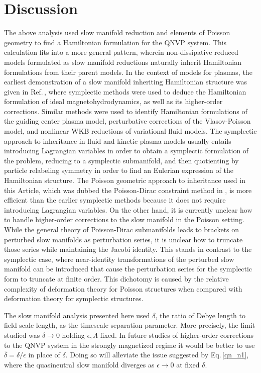 \documentclass[%
 aip,
 amsmath,amssymb,
reprint, onecolumn %
]{revtex4-1}
\begin{document}
\section{Discussion}
The above analysis used slow manifold reduction and elements of Poisson geometry to find a Hamiltonian formulation for the QNVP system. This calculation fits into a more general pattern\cite{r_s_mackay_slow_2004,j_w_burby_slow_2020,burby_slow_2022}, wherein non-dissipative reduced models formulated as slow manifold reductions naturally inherit Hamiltonian formulations from their parent models. In the context of models for plasmas, the earliest demonstration of a slow manifold inheriting Hamiltonian structure was given in Ref.\,, where symplectic methods were used to deduce the Hamiltonian formulation of ideal magnetohydrodynamics, as well as its higher-order corrections. Similar methods were used to identify Hamiltonian formulations of the guiding center plasma model\cite{burby_hamiltonian_2018}, perturbative corrections of the Vlasov-Poisson model\cite{miloshevich_hamiltonian_2021}, and nonlinear WKB reductions of variational fluid models\cite{burby_variational_2020}. The symplectic approach to inheritance in fluid and kinetic plasma models usually entails introducing Lagrangian variables in order to obtain a symplectic formulation of the problem, reducing to a symplectic submanifold, and then quotienting by particle relabeling symmetry in order to find an Eulerian expression of the Hamiltonian structure. The Poisson geometric approach to inheritance used in this Article, which was dubbed the Poisson-Dirac constraint method in \cite{Pinto_Burby_2025}, is more efficient than the earlier symplectic methods because it does not require introducing Lagrangian variables. On the other hand, it is currently unclear how to handle higher-order corrections to the slow manifold in the Poisson setting. While the general theory of Poisson-Dirac submanifolds leads to brackets on perturbed slow manifolds as perturbation series, it is unclear how to truncate those series while maintaining the Jacobi identity. This stands in contrast to the symplectic case, where near-identity transformations of the perturbed slow manifold can be introduced that cause the perturbation series for the symplectic form to truncate at finite order. This dichotomy is caused by the relative complexity of deformation theory for Poisson structures when compared with deformation theory for symplectic structures.

The slow manifold analysis presented here used $\delta$, the ratio of Debye length to field scale length, as the timescale separation parameter. More precisely, the limit studied was $\delta\rightarrow 0$ holding $\epsilon,\Lambda$ fixed. In future studies of higher-order corrections to the QNVP system in the strongly magnetized regime it would be better to use $\overline{\delta} = \delta/\epsilon$ in place of $\delta$. Doing so will alleviate the issue suggested by Eq.\,\eqref{qn_n1}, where the quasineutral slow manifold diverges as $\epsilon\rightarrow 0$ at fixed $\delta$. 
\end{document}
